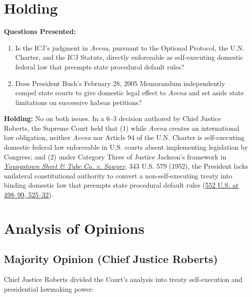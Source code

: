 \documentclass[12pt]{article}
\begin{document}
\section{Holding}
\textbf{Questions Presented:}

\begin{enumerate}
  \item Is the ICJ's judgment in \textit{Avena}, pursuant to the Optional Protocol, the U.N. Charter, and the ICJ Statute, directly enforceable as self-executing domestic federal law that preempts state procedural default rules?
  \item Does President Bush's February 28, 2005 Memorandum independently compel state courts to give domestic legal effect to \textit{Avena} and set aside state limitations on successive habeas petitions?
\end{enumerate}

\textbf{Holding:} No on both issues. In a 6--3 decision authored by Chief Justice Roberts, the Supreme Court held that (1) while \textit{Avena} creates an international law obligation, neither \textit{Avena} nor Article 94 of the U.N. Charter is self-executing domestic federal law enforceable in U.S. courts absent implementing legislation by Congress; and (2) under Category Three of Justice Jackson's framework in \href{https://supreme.justia.com/cases/federal/us/343/579/}{\textit{Youngstown Sheet \& Tube Co. v. Sawyer}}, 343 U.S. 579 (1952), the President lacks unilateral constitutional authority to convert a non-self-executing treaty into binding domestic law that preempts state procedural default rules (\href{https://supreme.justia.com/cases/federal/us/552/491/}{552 U.S. at 498--99, 525--32}).

\section{Analysis of Opinions}
\subsection{Majority Opinion (Chief Justice Roberts)}

Chief Justice Roberts divided the Court's analysis into treaty self-execution and presidential lawmaking power:
\end{document}
